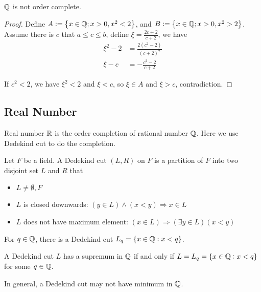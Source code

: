 \begin{theorem}
    $\mathbb{Q}$ is not order complete.
\end{theorem}
\begin{proof}
    Define $A:=\set{x \in \mathbb{Q}; x > 0 , x^2 < 2}$, and $B:=\set{x \in \mathbb{Q}; x > 0, x^2 > 2}$. Assume there is $c$ that $a \leq c \leq b$, define $\xi = \frac{2c+2}{c+2}$, we have
    \begin{equation}
        \begin{aligned}
            \xi^2 - 2 &= \frac{2(c^2 -2)}{(c+2)^2} \\
            \xi - c &= - \frac{c^2 -2}{c+2}    
        \end{aligned}      
    \end{equation}
    
    If $c^2 < 2$, we have $\xi^2 < 2$ and $\xi < c$, so $\xi \in A$ and $\xi > c$, contradiction.
\end{proof}


\subsection{Real Number}

Real number $\mathbb{R}$ is the order completion of rational number $\mathbb{Q}$. Here we use Dedekind cut to do the completion.

\begin{definition}
    Let $F$ be a field. A Dedekind cut $(L,R)$ on $F$ is a partition of $F$ into two disjoint set $L$ and $R$ that
    \begin{itemize}
        \item $L \neq \emptyset, F$
        \item $L$ is closed downwards: $(y \in L) \wedge (x < y) \Rightarrow x \in L$
        \item $L$ does not have maximum element: $(x \in L) \Rightarrow (\exists y \in L) (x < y)$
    \end{itemize}
\end{definition}
    
\begin{definition}
    For $q \in \mathbb{Q}$, there is a Dedekind cut $L_q = \set{x\in \mathbb{Q}: x < q}$.
\end{definition}

\begin{theorem}
     A Dedekind cut $L$ has a supremum in $\mathbb{Q}$ if and only if $L = L_q = \set{x \in \mathbb{Q}: x < q}$ for some $q\in \mathbb{Q}$.
     
     In general, a Dedekind cut may not have minimum in $\mathbb{Q}$.
\end{theorem}

